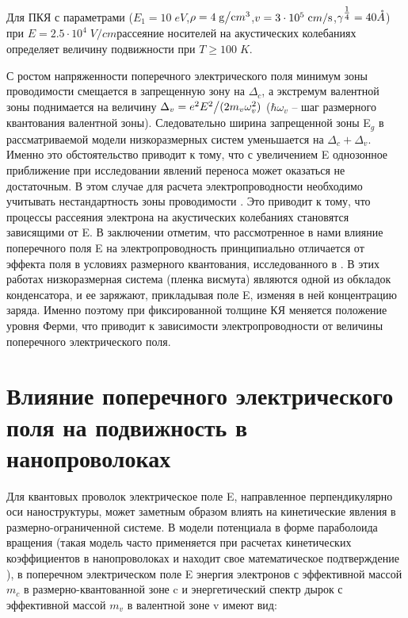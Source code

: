 Для ПКЯ с параметрами ($E_{1} =10{\mathrm \; eV}$,$\rho =4{\mathrm \; }{{\mathrm g} \mathord{\left/{\vphantom{{\mathrm g} {\mathrm cm}^{{\mathrm 3}} }}\right.\kern-\nulldelimiterspace} {\mathrm cm}^{{\mathrm 3}} } $,$v=3\cdot 10^{5} {\mathrm \; }{{\mathrm cm} \mathord{\left/{\vphantom{{\mathrm cm} {\mathrm s}}}\right.\kern-\nulldelimiterspace} {\mathrm s}} $,$\gamma ^{{\tfrac{1}{4}} } =40 \AA$) при $E=2.5\cdot 10^{4} {\mathrm \; V/cm}$рассеяние носителей на акустических колебаниях определяет величину подвижности при $T\ge 100{\mathrm \; K}$.

С ростом напряженности поперечного электрического поля минимум зоны проводимости смещается в запрещенную зону на $\Delta _{c} $, а экстремум валентной зоны поднимается на величину $\Delta _{v} ={e^{2} E^{2}  \mathord{\left/{\vphantom{e^{2} E^{2}  (2m_{v} }}\right.\kern-\nulldelimiterspace} (2m_{v} } \omega _{v}^{2} )$ ($\hbar \omega _{v} $ -- шаг размерного квантования валентной зоны). Следовательно ширина запрещенной зоны E${}_{g}$ в рассматриваемой модели низкоразмерных систем уменьшается на $\Delta _{c} +\Delta _{v} $. Именно это обстоятельство приводит к тому, что с увеличением E однозонное приближение при исследовании явлений переноса может оказаться не достаточным. В этом случае для расчета электропроводности необходимо учитывать нестандартность зоны проводимости \cite{Lax1960,Cohen1961}. Это приводит к тому, что процессы рассеяния электрона на акустических колебаниях становятся зависящими от E. В заключении отметим, что рассмотренное в нами влияние поперечного поля E на электропроводность принципиально отличается от эффекта поля в условиях размерного квантования, исследованного в \cite{Sandomirsky1967,Butenko1998}. В этих работах низкоразмерная система (пленка висмута) являются одной из обкладок конденсатора, и ее заряжают, прикладывая поле E, изменяя в ней концентрацию заряда. Именно поэтому при фиксированной толщине КЯ меняется положение уровня Ферми, что приводит к зависимости электропроводности от величины поперечного электрического поля.

\section{Влияние поперечного электрического поля на подвижность в нанопроволоках} \label{sect4_2}

Для квантовых проволок электрическое поле E, направленное перпендикулярно оси наноструктуры, может заметным образом влиять на кинетические явления в размерно-ограниченной системе. В модели потенциала в форме параболоида вращения (такая модель часто применяется при расчетах кинетических коэффициентов в нанопроволоках \cite{Geiler1998,Cros1992} и находит свое математическое подтверждение \cite{Beenakker1991}), в поперечном электрическом поле E энергия электронов с эффективной массой $m_{c} $ в размерно-квантованной зоне c и энергетический спектр дырок с эффективной массой $m_{v} $ в валентной зоне v имеют вид:

